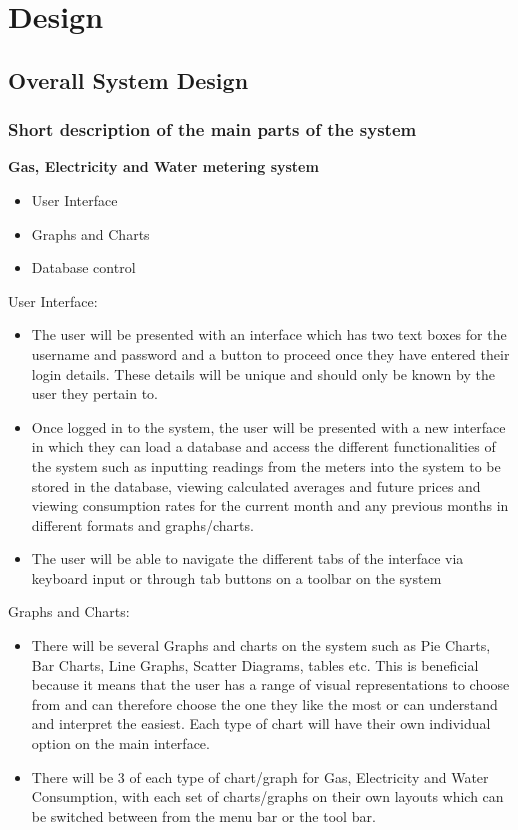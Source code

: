\chapter{Design}

\section{Overall System Design}

\subsection{Short description of the main parts of the system}
\textbf{Gas, Electricity and Water metering system}
\begin{itemize}
\item{User Interface}

\item{Graphs and Charts}
\item{Database control}
\end{itemize}
User Interface:
\begin{itemize}
\item{The user will be presented with an interface which has two text boxes for the username and password and a button to proceed once they have entered their login details. These details will be unique and should only be known by the user they pertain to.}
\item{Once logged in to the system, the user will be presented with a new interface in which they can load a database and access the different functionalities of the system such as inputting readings from the meters into the system to be stored in the database, viewing calculated averages and future prices and viewing consumption rates for the current month and any previous months in different formats and graphs/charts.}
\item{The user will be able to navigate the different tabs of the interface via keyboard input or through tab buttons on a toolbar on the system}
\end{itemize}

Graphs and Charts:
\begin{itemize}
\item{There will be several Graphs and charts on the system such as Pie Charts, Bar Charts, Line Graphs, Scatter Diagrams, tables etc. This is beneficial because it means that the user has a range of visual representations to choose from and can therefore choose the one they like the most or can understand and interpret the easiest. Each type of chart will have their own individual option on the main interface.}
\item{There will be 3 of each type of chart/graph for Gas, Electricity and Water Consumption, with each set of charts/graphs on their own layouts which can be switched between from the menu bar or the tool bar.}
\end{itemize}

